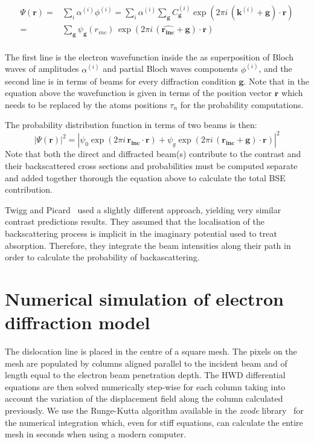 \begin{equation}
\begin{split}
    \Psi(\mathbf{r})  = & \sum_i \alpha^{(i)} \phi^{(i)} =  \sum_i \alpha^{(i)} \sum_{\mathbf{g}} C_{\mathbf{g}}^{(i)} \exp(2\pi i \, (\mathbf{k}^{(i)}+\mathbf{g})\cdot \mathbf{r}) \\
                  = & \sum_{\mathbf{g}} \psi_{\mathbf{g}}(r_{inc}) \, \exp(2\pi i \, (\mathbf{\hat{r_{inc}}} + \mathbf{g})\cdot \mathbf{r})\\
\end{split}
\end{equation}


The first line is the electron wavefunction inside the as superposition of Bloch waves of amplitudes  $\alpha^{(i)}$ and partial Bloch waves components $\phi^{(i)}$, and the second line is in terms of beams for every diffraction condition $\mathbf{g}$. Note that in the equation above the wavefunction is given in terms of the position vector $\mathbf{r}$ which needs to be replaced by the atoms positions $\tau_n$ for the probability computations. 

The probability distribution function in terms of two beams is then:
\begin{equation}
    |\Psi(\mathbf{r})|^2 = |\psi_0 \exp(2 \pi i \, \mathbf{r_{inc}}\cdot \mathbf{r}) + \psi_g \exp(2 \pi i \, (\mathbf{r_{inc}+\mathbf{g}})\cdot \mathbf{r})|^2
\end{equation}
Note that both the direct and diffracted beam(s) contribute to the contrast and their backscattered cross sections and probabilities must be computed separate and added together thorough the equation above to calculate the total BSE contribution.
 


Twigg and Picard~\cite{Twigg09} used a slightly different approach, yielding very similar contrast predictions results. They assumed that the localisation of the backscattering process is implicit in the imaginary potential used to treat absorption. Therefore, they integrate the beam intensities along their path in order to calculate the probability of backascattering.  


\section{ Numerical simulation of electron diffraction model}
\label{sec:numerical}
The dislocation line is placed in the centre of a square mesh. The pixels on the mesh are populated by columns aligned parallel to the incident beam and of length equal to the electron beam penetration depth. The HWD differential equations are then solved numerically step-wise for each column taking into account the variation of the displacement field along the column calculated previously. We use the Runge-Kutta algorithm available in the \textit{zvode} library~\cite{Hindmarsh85} for the numerical integration which, even for stiff equations, can calculate the entire mesh in seconds when using a modern computer.

